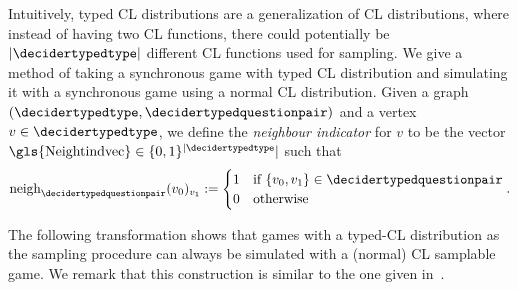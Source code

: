 
Intuitively, typed CL distributions are a generalization of CL distributions, where instead of having two CL functions, there could potentially be $|\decidertypedtype|$ different CL functions used for sampling. We give a method of taking a synchronous game with typed CL distribution and simulating it with a synchronous game using a normal CL distribution. Given a graph $(\decidertypedtype, \decidertypedquestionpair)$ and a vertex $v \in \decidertypedtype$, we define the \textit{neighbour indicator} for $v$ to be the vector $\text{\gls{Neightindvec}}\in \{0,1\}^{|\decidertypedtype}|$ such that
\begin{equation*}
	\text{neigh}_{\decidertypedquestionpair}(v_0)_{v_1} := \begin{cases}
		1 &\text{if } \{v_0, v_1\} \in \decidertypedquestionpair \\
		0 &\text{otherwise}
	\end{cases}.
\end{equation*} 

The following transformation shows that games with a typed-CL distribution as the sampling procedure can always be simulated with a (normal) CL samplable game. We remark that this construction is similar to the one given in~\cite[Section 6.2]{jiMIPRE2022a}.
 

